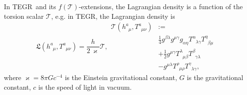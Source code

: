 \documentclass[
10pt, %
a4paper, %
oneside, %
twocolumn,
headinclude,footinclude, %
BCOR5mm, %
]{scrartcl}
\newcommand{\tetrsymbol}{h}
\newcommand{\tetr}[2]{\tetrsymbol^{#1}_{\phantom{#1}#2}}
\newcommand{\detTetr}{\tetrsymbol}
\newcommand{\Tors}[2]{T^{#1}_{\phantom{#1}#2}}
\newcommand{\Laghodge}{L}%
\newcommand{\Lagtors}{\mathfrak{L}}%
\newcommand{\tegr}{TEGR}
\newcommand{\HDT}[1]{\accentset{\star}{T}^{#1}}
\newcommand{\HDmix}{\accentset{\star}{T}}
\newcommand{\Tscal}{\mathcal{T}}		%
\begin{document}
	In \tegr\ and its $ f(\Tscal) $-extensions, the Lagrangian density is a function of the 
	torsion scalar $ \Tscal $, e.g. in \tegr, the Lagrangian density is
	\begin{subequations}\label{eqn.TEGR.Lagr}
		\begin{equation}
			\Lagtors(\tetr{a}{\mu},\Tors{a}{\mu\nu}) = \frac{\detTetr}{2 \, \varkappa} \Tscal,
		\end{equation}
		\begin{align}\label{eqn.tors.scal0}
			\Tscal(\tetr{a}{\mu},\Tors{a}{\mu\nu}) &:= \\
			&\frac14 g^{\beta\lambda} g^{\mu\gamma} g_{\alpha\eta} \Tors{\alpha}{\lambda\gamma}
			\Tors{\eta}{\beta\mu} \\
			&+
			\frac12 g^{\mu\gamma} \Tors{\lambda}{\mu\beta} \Tors{\beta}{\gamma\lambda} \\
			&- 
			g^{\mu\lambda} \Tors{\rho}{\mu\rho} \Tors{\gamma}{\lambda\gamma},	  
		\end{align}
	\end{subequations}
	where $ \varkappa = 8\pi G c^{-4} $ is the Einstein gravitational constant, $ G $ is the 
	gravitational constant, $ c $ is the speed of light in vacuum.
	
	
	
	
	
	
\end{document}
